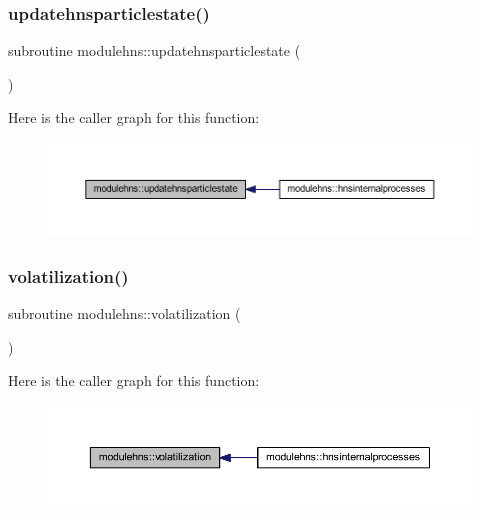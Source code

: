 \subsubsection{\texorpdfstring{updatehnsparticlestate()}{updatehnsparticlestate()}}
{\footnotesize\ttfamily subroutine modulehns\+::updatehnsparticlestate (\begin{DoxyParamCaption}{ }\end{DoxyParamCaption})\hspace{0.3cm}{\ttfamily [private]}}

Here is the caller graph for this function\+:\nopagebreak
\begin{figure}[H]
\begin{center}
\leavevmode
\includegraphics[width=350pt]{namespacemodulehns_a4966ebd0f80ed38b932eafaa93d15db4_icgraph}
\end{center}
\end{figure}
\mbox{\label{namespacemodulehns_afbe73cf1017e84dcb207a4be7e224a29}} 
\subsubsection{\texorpdfstring{volatilization()}{volatilization()}}
{\footnotesize\ttfamily subroutine modulehns\+::volatilization (\begin{DoxyParamCaption}{ }\end{DoxyParamCaption})\hspace{0.3cm}{\ttfamily [private]}}

Here is the caller graph for this function\+:\nopagebreak
\begin{figure}[H]
\begin{center}
\leavevmode
\includegraphics[width=350pt]{namespacemodulehns_afbe73cf1017e84dcb207a4be7e224a29_icgraph}
\end{center}
\end{figure}
\mbox{\label{namespacemodulehns_abf878e74b0b3dfd62305bbe1afe7b434}} 
